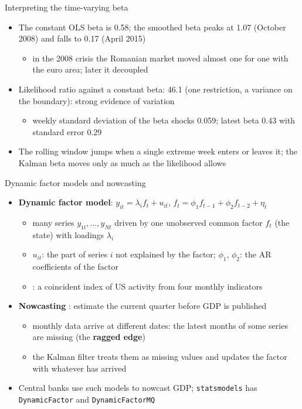 \begin{frame}{Interpreting the time-varying beta}
\itemsize{\small}
\begin{itemize}
    \item The constant OLS beta is 0.58; the smoothed beta peaks at 1.07 (October 2008) and falls to 0.17 (April 2015)
    \begin{itemize}
        \item in the 2008 crisis the Romanian market moved almost one for one with the euro area; later it decoupled
    \end{itemize}
    \item Likelihood ratio against a constant beta: 46.1 (one restriction, a variance on the boundary): strong evidence of variation
    \begin{itemize}
        \item weekly standard deviation of the beta shocks 0.059; latest beta 0.43 with standard error 0.29
    \end{itemize}
    \item The rolling window jumps when a single extreme week enters or leaves it; the Kalman beta moves only as much as the likelihood allows
\end{itemize}
\end{frame}

\begin{frame}{Dynamic factor models and nowcasting}
\itemsize{\small}
\begin{itemize}
    \item \textbf{Dynamic factor model}: $y_{it} = \lambda_if_t + u_{it}$, \quad $f_t = \phi_1f_{t-1} + \phi_2f_{t-2} + \eta_t$
    \begin{itemize}
        \item many series $y_{1t}, \dots, y_{Nt}$ driven by one unobserved common factor $f_t$ (the state) with loadings $\lambda_i$
        \item $u_{it}$: the part of series $i$ not explained by the factor; $\phi_1$, $\phi_2$: the AR coefficients of the factor
        \item {}: a coincident index of US activity from four monthly indicators
    \end{itemize}
    \item \textbf{Nowcasting} : estimate the current quarter before GDP is published
    \begin{itemize}
        \item monthly data arrive at different dates: the latest months of some series are missing (the \textbf{ragged edge})
        \item the Kalman filter treats them as missing values and updates the factor with whatever has arrived
    \end{itemize}
    \item Central banks use such models to nowcast GDP; \texttt{statsmodels} has \texttt{DynamicFactor} and \texttt{DynamicFactorMQ}
\end{itemize}
\end{frame}

